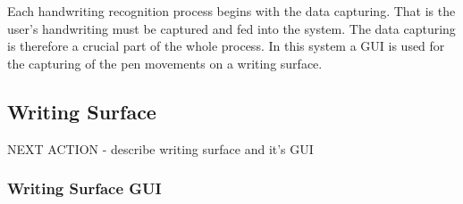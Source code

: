 Each handwriting recognition process begins with the data capturing.
That is the user's handwriting must be captured and fed into the system.
The data capturing is therefore a crucial part of the whole process.
In this system a GUI is used for the capturing of the pen movements on a 
writing surface.


%  
%  
%
%
%
% 
%

\subsection{Writing Surface} %
\label{sec:hwre:writingsurface}
NEXT ACTION - describe writing surface and it's GUI

\subsubsection{Writing Surface GUI}
\label{sec:hwre:writingsurfacegui}

